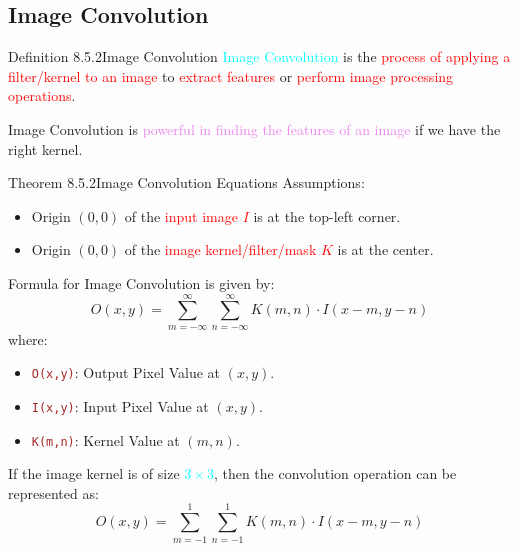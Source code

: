 \documentclass{book}
\begin{document}
\subsection{Image Convolution}
\begin{defBox}{Definition 8.5.2}{Image Convolution}
    \textcolor{cyan}{Image Convolution} is the \textcolor{red}{process of applying a filter/kernel to an image} to \textcolor{red}{extract features} or \textcolor{red}{perform image processing operations}.
\end{defBox}
Image Convolution is \textcolor{violet}{powerful in finding the features of an image} if we have the right kernel.\\
\begin{thmBox}{Theorem 8.5.2}{Image Convolution Equations}
    Assumptions:
    \begin{itemize}
        \item Origin $(0,0)$ of the \textcolor{red}{input image $I$} is at the top-left corner.
        \item Origin $(0,0)$ of the \textcolor{red}{image kernel/filter/mask $K$} is at the center.
    \end{itemize}
    Formula for Image Convolution is given by:
    \[
        O(x,y) = \sum_{m=-\infty}^{\infty} \sum_{n=-\infty}^{\infty} K(m,n) \cdot I(x-m, y-n)
    \]
    where:
    \begin{itemize}
        \item \textcolor{brown}{\texttt{O(x,y)}}: Output Pixel Value at $(x,y)$.
        \item \textcolor{brown}{\texttt{I(x,y)}}: Input Pixel Value at $(x,y)$.
        \item \textcolor{brown}{\texttt{K(m,n)}}: Kernel Value at $(m,n)$.
    \end{itemize}
\end{thmBox}
If the image kernel is of size \textcolor{cyan}{\(3 \times 3\)}, then the convolution operation can be represented as:
\[
    O(x,y) = \sum_{m=-1}^{1} \sum_{n=-1}^{1} K(m,n) \cdot I(x-m, y-n)
\]
\end{document}
